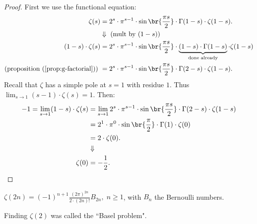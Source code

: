 \begin{proof}
First we use the functional equation:
\begin{align*}
    \zeta(s) &= 2^s \cdot \pi^{s-1} \cdot \sin\br{\frac{\pi s}{2}} \cdot \Gamma(1-s) \cdot \zeta(1-s).\\
    &\Downarrow \text{ (mult by $(1-s)$)}\\
    (1-s)\cdot \zeta(s) &= 2^s \cdot \pi^{s-1} \cdot \sin\br{\frac{\pi s}{2}} \cdot \underbrace{(1-s)\cdot \Gamma(1-s)}_{\text{done already}} \cdot \zeta(1-s)\\
    \text{(proposition (\ref{prop:g-factorial})) } &= 2^s \cdot \pi^{s-1} \cdot \sin\br{\frac{\pi s}{2}} \cdot \Gamma(2-s) \cdot \zeta(1-s).
\end{align*}
Recall that $\zeta$ has a simple pole at $s=1$ with residue $1$. Thus $\lim_{s\to 1} (s-1)\cdot \zeta(s) = 1$. Then:
\begin{align*}
    -1 = \lim_{s\to 1} (1-s)\cdot \zeta(s) &= \lim_{s\to 1} 2^s \cdot \pi^{s-1} \cdot \sin\br{\frac{\pi s}{2}} \cdot \Gamma(2-s) \cdot \zeta(1-s)\\
    & = 2^1 \cdot \pi^0 \cdot \sin\br{\frac{\pi}{2}} \cdot \Gamma(1) \cdot \zeta(0)\\
    &= 2 \cdot  \zeta(0).\\
    &\Downarrow\\
    \zeta(0) &= - \frac{1}{2}.
\end{align*}
\end{proof}


\begin{corollary}\label{cor:z-even}
$\zeta(2n) =(-1)^{n+1} \frac{(2\pi)^{2n}}{2 \cdot (2n)!} B_{2n}, \; n \geq 1$, with $B_n$ the Bernoulli numbers.
\end{corollary}

\begin{note}
Finding $\zeta(2)$ was called the ``Basel problem".
\end{note}

